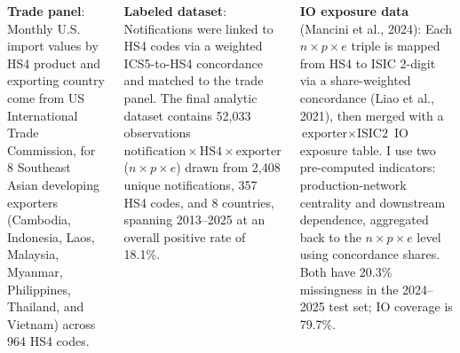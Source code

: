 \documentclass[20pt, a0paper, portrait]{tikzposter}
\begin{document}
\begin{columns}
{\textbf{Trade panel}: Monthly U.S. import values by HS4 product and exporting country come from US International Trade Commission, for 8 Southeast Asian developing exporters (Cambodia, Indonesia, Laos, Malaysia, Myanmar, Philippines, Thailand, and Vietnam) across 964 HS4 codes.

\vspace{10pt}

\textbf{Labeled dataset}: Notifications were linked to HS4 codes via a weighted ICS5-to-HS4 concordance and matched to the trade panel. The final analytic dataset contains 52,033 observations $\text{notification} \times \text{HS4} \times \text{exporter}$ ($n \times p \times e$) drawn from 2,408 unique notifications, 357 HS4 codes, and 8 countries, spanning 2013--2025 at an overall positive rate of 18.1\%.

\vspace{10pt}

\textbf{IO exposure data} (Mancini et al., 2024): Each $n \times p \times e$ triple is mapped from HS4 to ISIC 2-digit via a share-weighted concordance (Liao et al., 2021), then merged with a $\text{exporter} \times \text{ISIC2}$ IO exposure table. I use two pre-computed indicators: production-network centrality and downstream dependence, aggregated back to the $n \times p \times e$ level using concordance shares. Both have 20.3\% missingness in the 2024--2025 test set; IO coverage is 79.7\%.
}

\end{columns}
\end{document}
